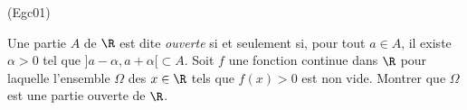 \begin{tiny}(Egc01)\end{tiny} Une partie $A$ de $\R$ est dite \emph{ouverte} si et seulement si, pour tout $a\in A$, il existe $\alpha>0$ tel que $]a-\alpha, a+\alpha[\subset A$. Soit $f$ une fonction continue dans $\R$ pour laquelle l'ensemble $\Omega$ des $x\in \R$ tels que $f(x)>0$ est non vide. Montrer que $\Omega$ est une partie ouverte de $\R$.